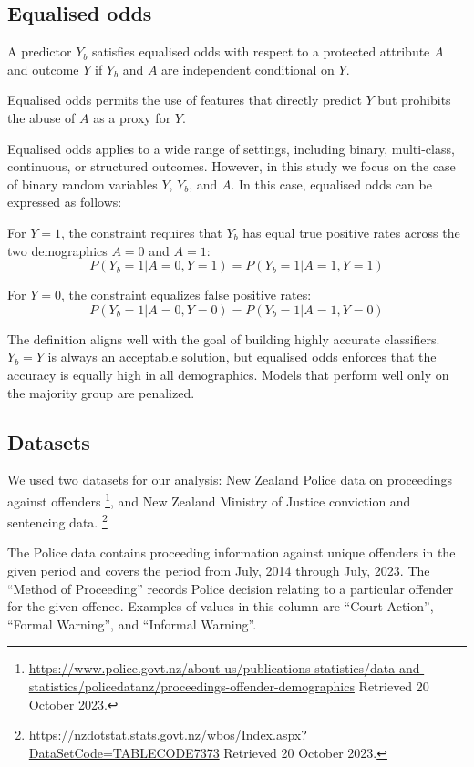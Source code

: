 \documentclass[runningheads]{llncs}
\begin{document}
\subsection{Equalised odds}
\label{sec:equalised-odds}

A predictor $Y_b$ satisfies equalised odds \cite{hardt2016equality}
with respect to a protected attribute $A$ and outcome $Y$ if $Y_b$ and
$A$ are independent conditional on $Y$.

Equalised odds permits the use of features that directly predict $Y$
but prohibits the abuse of $A$ as a proxy for $Y$.

Equalised odds applies to a wide range of settings, including binary,
multi-class, continuous, or structured outcomes. However, in this
study we focus on the case of binary random variables $Y$, $Y_b$, and
$A$. In this case, equalised odds can be expressed as follows:

For $Y = 1$, the constraint requires that $Y_b$ has equal true
positive rates across the two demographics $A = 0$ and $A = 1$:
\[
    P(Y_b = 1 | A = 0, Y = 1) = P(Y_b = 1 | A = 1, Y = 1)
\]

For $Y = 0$, the constraint equalizes false positive rates:
\[
    P(Y_b = 1 | A = 0, Y = 0) = P(Y_b = 1 | A = 1, Y = 0)
\]


The definition aligns well with the goal of building highly accurate
classifiers. $Y_b = Y$ is always an acceptable solution, but
equalised odds enforces that the accuracy is equally high in all
demographics. Models that perform well only on the majority group are
penalized.

\subsection{Datasets}
\label{sec:datasets}

We used two datasets for our analysis: New Zealand Police data on
proceedings against offenders%
\footnote{\url{https://www.police.govt.nz/about-us/publications-statistics/data-and-statistics/policedatanz/proceedings-offender-demographics}
    Retrieved 20 October 2023.}, and New Zealand Ministry of Justice
conviction and sentencing data.%
\footnote{\url{https://nzdotstat.stats.govt.nz/wbos/Index.aspx?DataSetCode=TABLECODE7373}
    Retrieved 20 October 2023.}

The Police data contains proceeding information against unique
offenders in the given period and covers the period from July, 2014
through July, 2023. The ``Method of Proceeding'' records Police
decision relating to a particular offender for the given offence.
Examples of values in this column are ``Court Action'', ``Formal
Warning'', and ``Informal Warning''.
\end{document}
